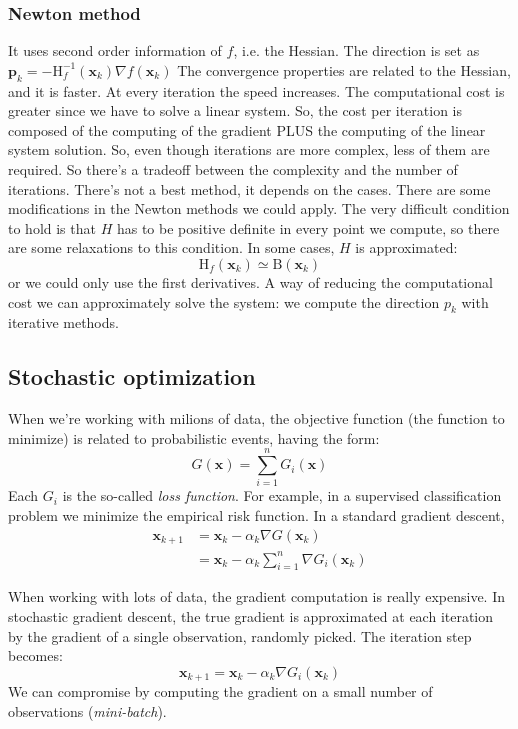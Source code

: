 \documentclass[11pt]{article}
\begin{document}
\subsubsection{Newton method}
It uses second order information of $f$, i.e. the Hessian.
The direction is set as $\mathbf{p}_{k}=-\mathrm{H}_{f}^{-1}\left(\mathbf{x}_{k}\right) \nabla f\left(\mathbf{x}_{k}\right)$
The convergence properties are related to the Hessian, and it is faster. At every iteration the speed increases. The computational cost is greater since we have to solve a linear system.
So, the cost per iteration is composed of the computing of the gradient PLUS the computing of the linear system solution. So, even though iterations are more complex, less of them are required. So there's a tradeoff between the complexity and the number of iterations.
There's not a best method, it depends on the cases.
There are some modifications in the Newton methods we could apply. The very difficult condition to hold is that $H$ has to be positive definite in every point we compute, so there are some relaxations to this condition. In some cases, $H$ is approximated:
\begin{displaymath}
    \mathrm{H}_{f}\left(\mathbf{x}_{k}\right) \simeq \mathrm{B}\left(\mathbf{x}_{k}\right)
\end{displaymath}
or we could only use the first derivatives.
A way of reducing the computational cost we can approximately solve the system: we compute the direction $p_k$ with iterative methods.
\subsection{Stochastic optimization}
When we're working with milions of data, the objective function (the function to minimize) is related to probabilistic events, having the form:
\begin{displaymath}
    G(\mathbf{x})=\sum_{i=1}^{n} G_{i}(\mathbf{x})
\end{displaymath}
Each $G_i$ is the so-called \textit{loss function}. For example, in a supervised classification problem we minimize the empirical risk function. In a standard gradient descent,
\begin{displaymath}
    
\begin{aligned}
    \mathbf{x}_{k+1} &=\mathbf{x}_{k}-\alpha_{k} \nabla G\left(\mathbf{x}_{k}\right) \\
    &=\mathbf{x}_{k}-\alpha_{k} \sum_{i=1}^{n} \nabla G_{i}\left(\mathbf{x}_{k}\right)
    \end{aligned}\end{displaymath}

When working with lots of data, the gradient computation is really expensive. In stochastic gradient descent, the true gradient is approximated at each iteration by the gradient of a single observation, randomly picked. The iteration step becomes:
\begin{displaymath}
    \mathbf{x}_{k+1}=\mathbf{x}_{k}-\alpha_{k} \nabla G_{i}\left(\mathbf{x}_{k}\right)
\end{displaymath}
We can compromise by computing the gradient on a small number of observations (\textit{mini-batch}).
\end{document}
